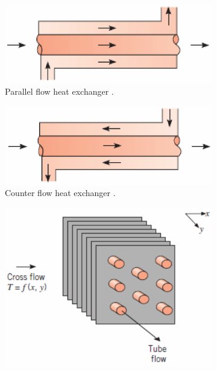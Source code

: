 \begin{figure}[h]
    \centering
    \begin{subfigure}[b]{0.4\textwidth}
        \centering
        \includegraphics[width=\textwidth]{parallele_flow}
        \caption{Parallel flow heat exchanger \cite{Ngendakumana2018}.}
        \label{fig:C4_para_flow}
    \end{subfigure}
    \begin{subfigure}[b]{0.4\textwidth}
        \centering
        \includegraphics[width=\textwidth]{opposite_flow}
        \caption{Counter flow heat exchanger \cite{Ngendakumana2018}.}
        \label{fig:C4_counter_flow}
    \end{subfigure}
    \begin{subfigure}[b]{0.4\textwidth}
        \centering
        \includegraphics[width=\textwidth]{crossed_flow_non_mixed}

\end{subfigure}
\end{figure}

